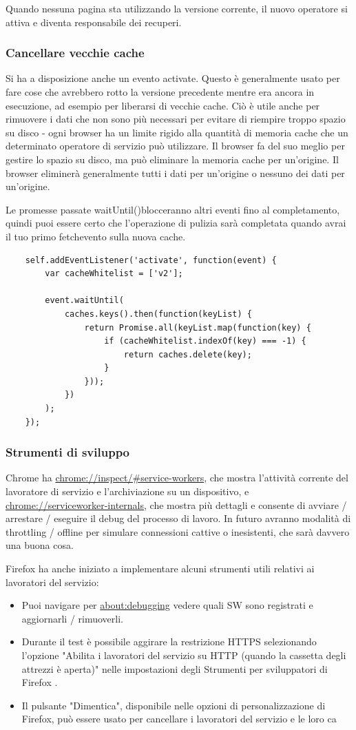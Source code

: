 \documentclass[italian]{article}
\begin{document}
Quando nessuna pagina sta utilizzando la versione corrente, il nuovo operatore si attiva e diventa responsabile dei recuperi.

\subsubsection{Cancellare vecchie cache}
Si ha a disposizione anche un evento activate. Questo è generalmente usato per fare cose che avrebbero rotto la versione precedente mentre era ancora in esecuzione, ad esempio per liberarsi di vecchie cache. Ciò è utile anche per rimuovere i dati che non sono più necessari per evitare di riempire troppo spazio su disco - ogni browser ha un limite rigido alla quantità di memoria cache che un determinato operatore di servizio può utilizzare. Il browser fa del suo meglio per gestire lo spazio su disco, ma può eliminare la memoria cache per un'origine. Il browser eliminerà generalmente tutti i dati per un'origine o nessuno dei dati per un'origine.

Le promesse passate waitUntil()blocceranno altri eventi fino al completamento, quindi puoi essere certo che l'operazione di pulizia sarà completata quando avrai il tuo primo fetchevento sulla nuova cache.

\begin{lstlisting}
	self.addEventListener('activate', function(event) {
		var cacheWhitelist = ['v2'];
		
		event.waitUntil(
			caches.keys().then(function(keyList) {
				return Promise.all(keyList.map(function(key) {
					if (cacheWhitelist.indexOf(key) === -1) {
						return caches.delete(key);
					}
				}));
			})
		);
	});
\end{lstlisting}

\subsubsection{Strumenti di sviluppo}
Chrome ha \url{chrome://inspect/#service-workers}, che mostra l'attività corrente del lavoratore di servizio e l'archiviazione su un dispositivo, e \url{chrome://serviceworker-internals}, che mostra più dettagli e consente di avviare / arrestare / eseguire il debug del processo di lavoro. In futuro avranno modalità di throttling / offline per simulare connessioni cattive o inesistenti, che sarà davvero una buona cosa.

Firefox ha anche iniziato a implementare alcuni strumenti utili relativi ai lavoratori del servizio:
\begin{itemize}
\item Puoi navigare per \url{about:debugging} vedere quali SW sono registrati e aggiornarli / rimuoverli.
\item Durante il test è possibile aggirare la restrizione HTTPS selezionando l'opzione "Abilita i lavoratori del servizio su HTTP (quando la cassetta degli attrezzi è aperta)" nelle impostazioni degli Strumenti per sviluppatori di Firefox .
\item Il pulsante "Dimentica", disponibile nelle opzioni di personalizzazione di Firefox, può essere usato per cancellare i lavoratori del servizio e le loro ca
\end{itemize}
\end{document}
